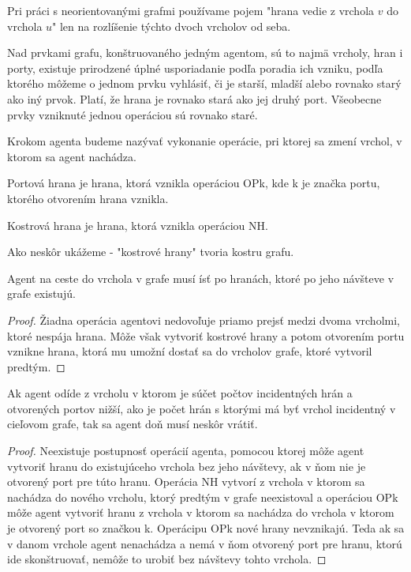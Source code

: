 \begin{pozn}
Pri práci s neorientovanými grafmi používame pojem "hrana vedie z vrchola
$v$
do vrchola $u$" len na rozlíšenie týchto dvoch vrcholov od seba.
\end{pozn}

\begin{ozn}
Nad prvkami grafu, konštruovaného jedným agentom,
  sú to najmä vrcholy, hran i porty, existuje prirodzené úplné
usporiadanie podľa poradia ich vzniku, podľa ktorého môžeme o jednom prvku
vyhlásiť, či je starší, mladší alebo rovnako starý ako iný prvok. Platí, že
hrana je rovnako stará ako jej druhý port. Všeobecne prvky vzniknuté jednou
operáciou sú rovnako staré.
\end{ozn}

\begin{ozn}
Krokom agenta budeme nazývať vykonanie operácie, pri ktorej sa zmení vrchol,
v ktorom sa agent nachádza.
\end{ozn}

\begin{ozn}
Portová hrana je hrana, ktorá vznikla operáciou OPk, kde k je značka portu,
ktorého otvorením hrana vznikla.
\end{ozn}
\begin{ozn}
Kostrová hrana je hrana, ktorá vznikla operáciou NH.
\end{ozn}
\begin{pozn}
Ako neskôr ukážeme - "kostrové hrany" tvoria kostru grafu.
\end{pozn}

\begin{lem}
Agent na ceste do vrchola v grafe musí ísť po hranách, ktoré po jeho
návšteve v grafe existujú.
\end{lem}

\begin{proof}
Žiadna operácia agentovi nedovoľuje priamo prejsť medzi dvoma vrcholmi, ktoré
nespája hrana. Môže však vytvoriť kostrové hrany a potom otvorením portu
vznikne hrana, ktorá mu umožní dostať sa do vrcholov grafe, ktoré vytvoril
predtým.
\end{proof}

\begin{lem}
Ak agent odíde z vrcholu v ktorom je súčet počtov incidentných hrán a
otvorených portov nižší, ako je počet hrán s ktorými má byť vrchol
incidentný v cieľovom grafe, tak sa agent doň musí neskôr vrátiť.
\end{lem}

\begin{proof}
Neexistuje postupnosť operácií agenta, pomocou ktorej môže agent vytvoriť
hranu do
existujúceho vrchola bez jeho návštevy, ak v ňom nie je otvorený port pre
túto hranu. Operácia NH vytvorí z vrchola v ktorom sa nachádza do nového
vrcholu, ktorý predtým v grafe neexistoval a operáciou OPk môže agent
vytvoriť hranu z vrchola v ktorom sa nachádza do vrchola v ktorom je
otvorený port so značkou k. Operácipu OPk nové hrany nevznikajú. Teda ak sa
v danom vrchole agent nenachádza a nemá v ňom otvorený port pre hranu,
ktorú ide skonštruovať, nemôže to urobiť bez návštevy tohto vrchola.
\end{proof}

